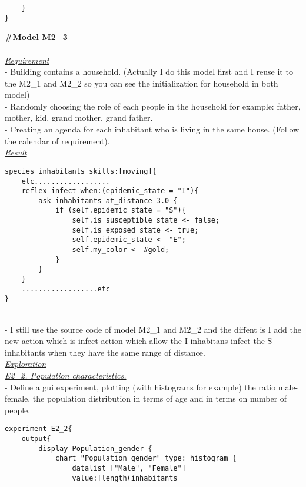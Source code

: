 \documentclass{article}
\begin{document}
\begin{pic15}
\begin{tcolorbox}
\begin{lstlisting}
	}
}
\end{lstlisting}
\end{tcolorbox}
\newpage
\underline{\textbf{#Model M2\_3}}\\
\\[1\baselineskip]
\underline{\emph{Requirement}}
\\[1\baselineskip]
- Building contains a household. (Actually I do this model first and I reuse it to the M2\_1 and M2\_2 so you can see the initialization for household in both model)
\\
- Randomly choosing the role of each people in the household for example: father, mother, kid, grand mother, grand father.
\\
- Creating an agenda for each inhabitant who is living in the same house. (Follow the calendar of requirement).
\\[1\baselineskip]
\underline{\emph{Result}}\newline\newline
\begin{tcolorbox}
\begin{lstlisting}
species inhabitants skills:[moving]{
	etc..................
	reflex infect when:(epidemic_state = "I"){
		ask inhabitants at_distance 3.0 {
			if (self.epidemic_state = "S"){
				self.is_susceptible_state <- false;
				self.is_exposed_state <- true;
				self.epidemic_state <- "E";
				self.my_color <- #gold;
			}
		}
	}
	..................etc
}
\end{lstlisting}
\end{tcolorbox}
\newpage
\\- I still use the source code of model M2\_1 and M2\_2 and the diffent is I add the new action which is infect action which allow the I inhabitans infect the S inhabitants when they have the same range of distance.
\\[1\baselineskip]
\underline{\emph{Exploration}}
\\[1\baselineskip]
\underline{\textit{E2\_2. Population characteristics.}}
\\- Define a gui experiment, plotting (with histograms for example) the ratio male-female, the population distribution in terms of age and in terms on number of people.
\\[1\baselineskip]
\begin{tcolorbox}
\begin{lstlisting}
experiment E2_2{
	output{
		display Population_gender {
			chart "Population gender" type: histogram {
				datalist ["Male", "Female"] 
				value:[length(inhabitants 

\end{lstlisting}
\end{tcolorbox}
\end{pic15}
\end{document}
